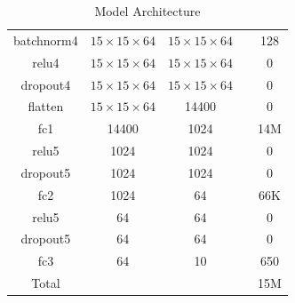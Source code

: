 \documentclass{article}
\begin{document}
\begin{sloppypar}
\begin{center}
\begin{table}[!h]
\begin{tabular}{|c|c|c|c|c|}
                    batchnorm4 & $15\times 15\times 64$ & $15\times 15\times 64$ & & 128\\
                    relu4 & $15\times 15\times 64$ & $15\times 15\times 64$ & & 0\\
                    dropout4 & $15\times 15\times 64$ & $15\times 15\times 64$ & & 0\\
                    \hline
                    flatten & $15\times 15\times 64$ & 14400 & & 0\\
                    \hline
                    fc1 & 14400 & 1024 & & 14M\\
                    relu5 & 1024 & 1024 & & 0\\
                    dropout5 & 1024 & 1024 & & 0\\
                    \hline
                    fc2 & 1024 & 64 & & 66K\\
                    relu5 & 64 & 64 & & 0\\
                    dropout5 & 64 & 64 & & 0\\
                    \hline
                    fc3 & 64 & 10 & & 650\\
                    \hline \hline
                    Total & & & & 15M\\
                    \hline
                \end{tabular}
                \caption{\label{table-1}Model Architecture}
            \end{table}
        \end{center}


\end{sloppypar}
\end{document}
